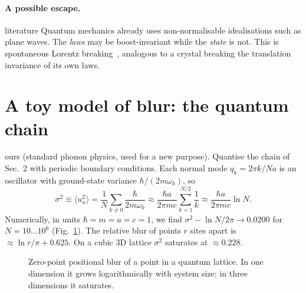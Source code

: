 \documentclass[11pt,a4paper]{article}
\newcommand{\tagbox}[2]{\textsf{\scriptsize\colorbox{#1!12}{\textcolor{#1!70!black}{#2}}}}
\newcommand{\lit}{\tagbox{blue}{literature}}
\newcommand{\ours}{\tagbox{orange}{ours}}
\begin{document}
\paragraph{A possible escape.} \lit{} Quantum mechanics already uses non-normalisable idealisations such as plane waves. The \emph{laws} may be boost-invariant while the \emph{state} is not. This is spontaneous Lorentz breaking~\cite{KosteleckySamuel89,JacobsonMattingly01}, analogous to a crystal breaking the translation invariance of its own laws.

\section{A toy model of blur: the quantum chain}
\ours{} (standard phonon physics, used for a new purpose). Quantise the chain of Sec.~2 with periodic boundary conditions. Each normal mode $q_k=2\pi k/Na$ is an oscillator with ground-state variance $\hbar/(2m\omega_k)$, so
\begin{equation}
\sigma^2\equiv\langle u_n^2\rangle=\frac1N\sum_{k\neq0}\frac{\hbar}{2m\omega_k}\approx\frac{\hbar a}{2\pi mc}\sum_{k=1}^{N/2}\frac1k\approx\frac{\hbar a}{2\pi mc}\ln N .
\end{equation}
Numerically, in units $\hbar=m=a=c=1$, we find $\sigma^2-\ln N/2\pi\to0.0200$ for $N=10\ldots10^6$ (Fig.~\ref{fig:blur}). The relative blur of points $r$ sites apart is $\approx\ln r/\pi+0.625$. On a cubic 3D lattice $\sigma^2$ saturates at $\approx0.228$.

\begin{figure}[t]
\centering
{}
\caption{Zero-point positional blur of a point in a quantum lattice. In one dimension it grows logarithmically with system size; in three dimensions it saturates.}
\label{fig:blur}
\end{figure}
\end{document}
